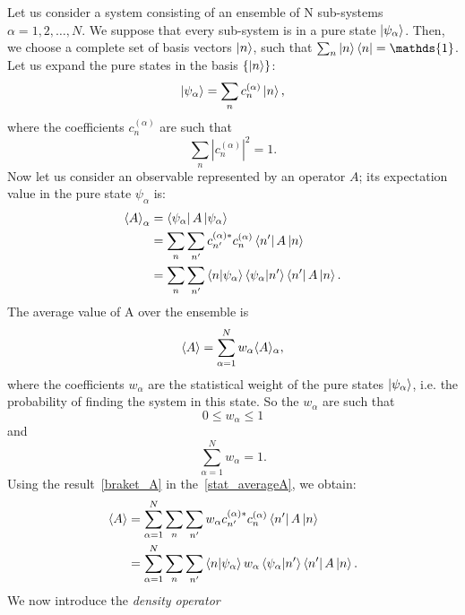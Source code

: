 Let us consider a system consisting of an ensemble of N sub-systems $\alpha = 1, 2, \dots , N$. We suppose that every sub-system is in a pure state $\ket{\psi_\alpha}$. Then, we choose a complete set of basis vectors $\ket{n}$, such that $\sum_n \ket{n}\bra{n} = \mathds{1}$. Let us expand the pure states in the basis $\{\ket{n}\}$:
\begin{equation*}
    \ket{\psi_\alpha} = \sum_n c_n^{(\alpha)}\ket{n},
\end{equation*}
where the coefficients $c_n^{(\alpha)}$ are such that
\begin{equation*}
    \sum_n |c_n^{(\alpha)}|^2 = 1.
\end{equation*}
Now let us consider an observable represented by an operator $A$; its expectation value in the pure state $\psi_\alpha$ is:
\begin{align}
    \braket{A}_\alpha &= \bra{\psi_\alpha}A\ket{\psi_\alpha} \\
                      \label{braket_A}
                      &= \sum_n \sum_{n'} c_{n'}^{(\alpha)*} c_n^{(\alpha)} \bra{n'}A\ket{n} \\
                      &= \sum_n \sum_{n'} \braket{n|\psi_\alpha}\braket{\psi_\alpha|n'} \bra{n'}A\ket{n}.
\end{align}
The average value of A over the ensemble is
\begin{equation}
\label{stat_averageA}
    \braket{A} = \sum_{\alpha = 1}^N w_\alpha \langle A \rangle_\alpha,
\end{equation}
where the coefficients $w_\alpha$ are the statistical weight of the pure states $\ket{\psi_\alpha}$, i.e. the probability of finding the system in this state. 
So the $w_\alpha$ are such that
\begin{equation}
\label{charact_weights}
    0 \leq w_\alpha \leq 1
\end{equation}
and 
\begin{equation*}
    \sum_{\alpha=1}^N w_\alpha = 1.
\end{equation*}
Using the result~\ref{braket_A} in the~\ref{stat_averageA}, we obtain:
\begin{align}
    \braket{A} &= \sum_{\alpha = 1}^N \sum_n \sum_{n'} w_\alpha c_{n'}^{(\alpha)*} c_n^{(\alpha)} \bra{n'}A\ket{n} \\
                \label{total_stat_average}
               &= \sum_{\alpha = 1}^N \sum_n \sum_{n'} \braket{n|\psi_\alpha}w_\alpha \braket{\psi_\alpha|n'} \bra{n'}A\ket{n}.
\end{align}
We now introduce the \emph{density operator}
